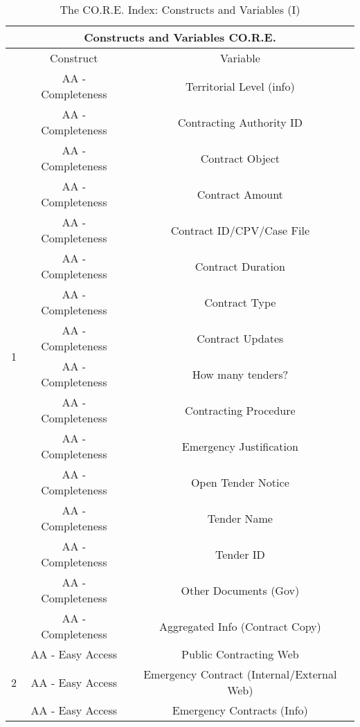 \documentclass[a4paper, twoside]{report}
\begin{document}
\begin{table}[htbp]
  \centering
  \caption{The CO.R.E. Index: Constructs and Variables (I)}
   \tabcolsep=0.60cm
	\renewcommand{\arraystretch}{1}
	\begin{adjustbox}{max width=\linewidth}
    \begin{tabular}{ccc}
    \multicolumn{3}{c}{Constructs and Variables CO.R.E.} \\
    \midrule
          & Construct & Variable \\
    \midrule
    \multirow{16}[2]{*}{1} & AA - Completeness & Territorial Level (info) \\
          & AA - Completeness & Contracting Authority ID \\
          & AA - Completeness & Contract Object \\
          & AA - Completeness & Contract Amount \\
          & AA - Completeness & Contract ID/CPV/Case File \\
          & AA - Completeness & Contract Duration \\
          & AA - Completeness & Contract Type \\
          & AA - Completeness & Contract Updates \\
          & AA - Completeness & How many tenders? \\
          & \cellcolor[rgb]{ .851,  .851,  .851}AA - Completeness & \cellcolor[rgb]{ .851,  .851,  .851}Contracting Procedure \\
          & \cellcolor[rgb]{ .851,  .851,  .851}AA - Completeness & \cellcolor[rgb]{ .851,  .851,  .851}Emergency Justification \\
          & AA - Completeness & Open Tender Notice \\
          & AA - Completeness & Tender Name \\
          & AA - Completeness & Tender ID \\
          & AA - Completeness & Other Documents (Gov) \\
          & AA - Completeness & Aggregated Info (Contract Copy) \\
    \midrule
    \multirow{16}[2]{*}{2} & AA - Easy Access & Public Contracting Web \\
          & \cellcolor[rgb]{ .851,  .851,  .851}AA - Easy Access & \cellcolor[rgb]{ .851,  .851,  .851}Emergency Contract (Internal/External Web) \\
          & \cellcolor[rgb]{ .851,  .851,  .851}AA - Easy Access & \cellcolor[rgb]{ .851,  .851,  .851}Emergency Contracts (Info) \\

\end{tabular}
\end{adjustbox}
\end{table}
\end{document}
